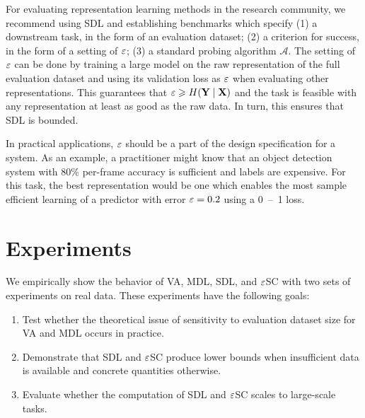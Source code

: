 For evaluating representation learning methods in the research community, we recommend using SDL and establishing benchmarks which specify (1) a downstream task, in the form of an evaluation dataset; (2) a criterion for success, in the form of a setting of $\varepsilon$; (3) a standard probing algorithm $\mathcal{A}$.
The setting of $\varepsilon$ can be done by training a large model on the raw representation of the full evaluation dataset and using its validation loss as $\varepsilon$ when evaluating other representations.
This guarantees that $\varepsilon \geqslant H({\mathbf{Y}} \mid {\mathbf{X}})$ and the task is feasible with any representation at least as good as the raw data.
In turn, this ensures that SDL is bounded.


In practical applications, $\varepsilon$ should be a part of the design specification for a system.
As an example, a practitioner might know that an object detection system with 80\% per-frame accuracy is sufficient and labels are expensive.
For this task, the best representation would be one which enables the most sample efficient learning of a predictor with error $\varepsilon = 0.2$ using a 0~--~1 loss.





\section{Experiments} \label{sec:experiments}

We empirically show the behavior of VA, MDL, SDL, and $\varepsilon$SC with two sets of experiments on real data.
These experiments have the following goals:
\begin{enumerate}
    \item Test whether the theoretical issue of sensitivity to evaluation dataset size for VA and MDL occurs in practice.
    \item Demonstrate that SDL and $\varepsilon$SC produce lower bounds when insufficient data is available and concrete quantities otherwise.
    \item Evaluate whether the computation of SDL and $\varepsilon$SC scales to large-scale tasks.
\end{enumerate}

